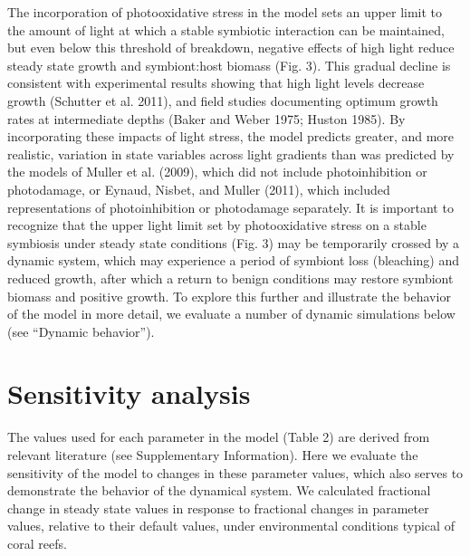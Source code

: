 \documentclass[]{elsarticle} %
\begin{document}
The incorporation of photooxidative stress in the model sets an upper
limit to the amount of light at which a stable symbiotic interaction can
be maintained, but even below this threshold of breakdown, negative
effects of high light reduce steady state growth and symbiont:host
biomass (Fig. 3). This gradual decline is consistent with experimental
results showing that high light levels decrease growth (Schutter et al.
2011), and field studies documenting optimum growth rates at
intermediate depths (Baker and Weber 1975; Huston 1985). By
incorporating these impacts of light stress, the model predicts greater,
and more realistic, variation in state variables across light gradients
than was predicted by the models of Muller et al. (2009), which did not
include photoinhibition or photodamage, or Eynaud, Nisbet, and Muller
(2011), which included representations of photoinhibition or photodamage
separately. It is important to recognize that the upper light limit set
by photooxidative stress on a stable symbiosis under steady state
conditions (Fig. 3) may be temporarily crossed by a dynamic system,
which may experience a period of symbiont loss (bleaching) and reduced
growth, after which a return to benign conditions may restore symbiont
biomass and positive growth. To explore this further and illustrate the
behavior of the model in more detail, we evaluate a number of dynamic
simulations below (see ``Dynamic behavior'').

\section{Sensitivity analysis}\label{sensitivity-analysis}

The values used for each parameter in the model (Table 2) are derived
from relevant literature (see Supplementary Information). Here we
evaluate the sensitivity of the model to changes in these parameter
values, which also serves to demonstrate the behavior of the dynamical
system. We calculated fractional change in steady state values in
response to fractional changes in parameter values, relative to their
default values, under environmental conditions typical of coral reefs.
\end{document}
